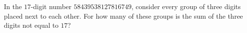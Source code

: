 In the $17$-digit number $58439538127816749$, consider every group of three digits placed next to each other. For how many of these groups is the sum of the three digits not equal to $17$?
